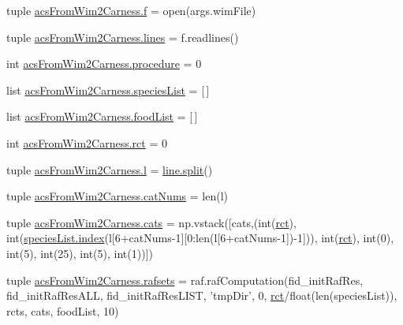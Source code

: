\begin{DoxyCompactItemize}
\item 
tuple \hyperlink{a00100_ab599c65fad60b9c6ccc220002ce8f89c}{acs\-From\-Wim2\-Carness.\-f} = open(args.\-wim\-File)
\item 
tuple \hyperlink{a00100_a2a83f40b2aa2cbcbd487195fef9af340}{acs\-From\-Wim2\-Carness.\-lines} = f.\-readlines()
\item 
int \hyperlink{a00100_ac84174dad0b933ca88ebdb79cf3497ec}{acs\-From\-Wim2\-Carness.\-procedure} = 0
\item 
list \hyperlink{a00100_aff8baae5d4cd1678204477dd5e620775}{acs\-From\-Wim2\-Carness.\-species\-List} = \mbox{[}$\,$\mbox{]}
\item 
list \hyperlink{a00100_a878da371fd02e9515fe7305e0a57be09}{acs\-From\-Wim2\-Carness.\-food\-List} = \mbox{[}$\,$\mbox{]}
\item 
int \hyperlink{a00100_a61159eb5aec77b97808ce3fb742d8f6d}{acs\-From\-Wim2\-Carness.\-rct} = 0
\item 
tuple \hyperlink{a00100_a0437cd4d2a377ca0e34ab59f4bfd833f}{acs\-From\-Wim2\-Carness.\-l} = \hyperlink{a00076_a4d1aa74fac80ae0275c056575fdb6626}{line.\-split}()
\item 
tuple \hyperlink{a00100_a0d474343423a1a87a760dd91411f96b4}{acs\-From\-Wim2\-Carness.\-cat\-Nums} = len(l)
\item 
tuple \hyperlink{a00100_aea4d714ca7ceaba151380b3aed7c34d8}{acs\-From\-Wim2\-Carness.\-cats} = np.\-vstack(\mbox{[}cats,(int(\hyperlink{a00028_a188d6e4d5a19aaeb1532fc5b9791afba}{rct}), int(\hyperlink{a00060_a0cd6a44ffb07342cbc7e5ac33bfc9495}{species\-List.\-index}(l\mbox{[}6+cat\-Nums-\/1\mbox{]}\mbox{[}0\-:len(l\mbox{[}6+cat\-Nums-\/1\mbox{]})-\/1\mbox{]})), int(\hyperlink{a00028_a188d6e4d5a19aaeb1532fc5b9791afba}{rct}), int(0), int(5), int(25), int(5), int(1))\mbox{]})
\item 
tuple \hyperlink{a00100_a36370edf2a6a4e19f0a99413aac43096}{acs\-From\-Wim2\-Carness.\-rafsets} = raf.\-raf\-Computation(fid\-\_\-init\-Raf\-Res, fid\-\_\-init\-Raf\-Res\-A\-L\-L, fid\-\_\-init\-Raf\-Res\-L\-I\-S\-T, 'tmp\-Dir', 0, \hyperlink{a00028_a188d6e4d5a19aaeb1532fc5b9791afba}{rct}/float(len(species\-List)), rcts, cats, food\-List, 10)
\end{DoxyCompactItemize}
